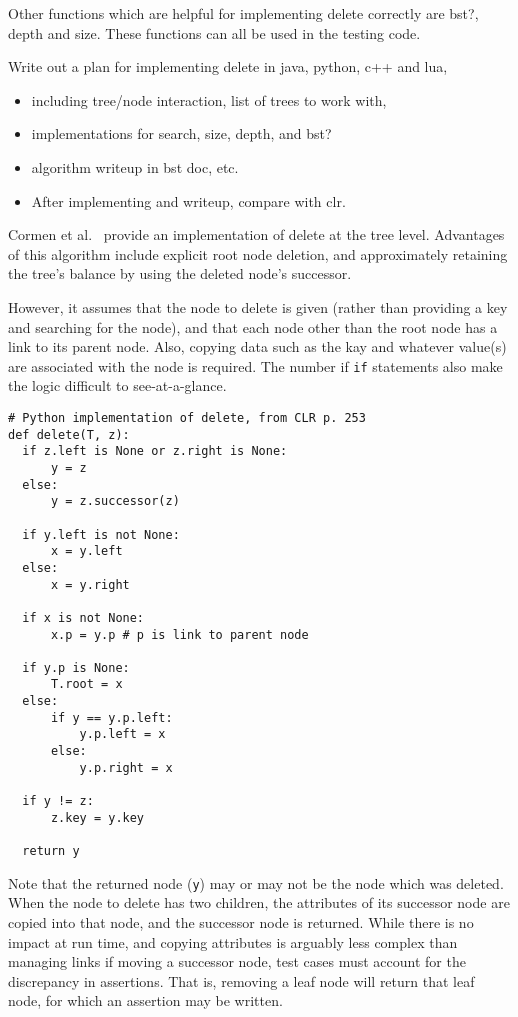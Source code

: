 \documentclass{article}
\begin{document}
Other functions which are helpful for implementing delete correctly
are bst?, depth and size. These functions can all be used in the testing
code.

Write out a plan for implementing delete in java, python, c++ and lua,

\begin{itemize}
  \item including tree/node interaction, list of trees to work with,
  \item implementations for search, size, depth, and bst?
  \item algorithm writeup in bst doc, etc.
  \item After implementing and writeup, compare with clr.
\end{itemize}

Cormen et al.~\cite[p. 253]{cormen:th:1990} provide an implementation of
delete at the tree level. Advantages of this algorithm include explicit root node
deletion, and approximately retaining the tree's balance by using the deleted
node's successor.

However, it assumes that the node to delete is
given (rather than providing a key and searching for the node), and that
each node other than the root node has a link to its parent node.
Also, copying data such as the kay and whatever value(s) are associated
with the node is required. The number if {\tt if} statements also make
the logic difficult to see-at-a-glance.

\begin{lstlisting}[frame=single]
# Python implementation of delete, from CLR p. 253
def delete(T, z):
  if z.left is None or z.right is None:
      y = z
  else:
      y = z.successor(z)

  if y.left is not None:
      x = y.left
  else:
      x = y.right

  if x is not None:
      x.p = y.p # p is link to parent node

  if y.p is None:
      T.root = x
  else:
      if y == y.p.left:
          y.p.left = x
      else:
          y.p.right = x

  if y != z:
      z.key = y.key

  return y
\end{lstlisting}

Note that the returned node ({\tt y}) may or may not be the node
which was deleted. When the node to delete has two children, the
attributes of its successor node are copied into that node, and the
successor node is returned. While there is no impact at run time,
and copying attributes is arguably less complex than managing links
if moving a successor node, test cases must account for the discrepancy
in assertions. That is, removing a leaf node will return that leaf node,
for which an assertion may be written.
\end{document}

